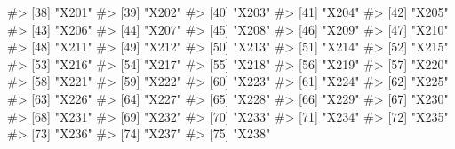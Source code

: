 \documentclass[
  letterpaper,
]{latex/krantz}
\makeatletter
\newenvironment{Shaded}{\begin{snugshade}}{\end{snugshade}}
\newcommand{\CommentTok}[1]{\textcolor[rgb]{0.37,0.37,0.37}{#1}}
\newenvironment{kframe}{%
\medskip{}
\setlength{\fboxsep}{.8em}
 \def\at@end@of@kframe{}%
 \ifinner\ifhmode%
  \def\at@end@of@kframe{\end{minipage}}%
  \begin{minipage}{\columnwidth}%
 \fi\fi%
 \def\FrameCommand##1{\hskip\@totalleftmargin \hskip-\fboxsep
 \colorbox{shadecolor}{##1}\hskip-\fboxsep
     \hskip-\linewidth \hskip-\@totalleftmargin \hskip\columnwidth}%
 \MakeFramed {\advance\hsize-\width
   \@totalleftmargin\z@ \linewidth\hsize
   \@setminipage}}%
 {\par\unskip\endMakeFramed%
 \at@end@of@kframe}
\renewenvironment{Shaded}{\begin{kframe}}{\end{kframe}}
\makeatother
\begin{document}
\begin{Shaded}
\begin{Highlighting}[]
\CommentTok{\#\textgreater{} [38] "X201"                            }
\CommentTok{\#\textgreater{} [39] "X202"                            }
\CommentTok{\#\textgreater{} [40] "X203"                            }
\CommentTok{\#\textgreater{} [41] "X204"                            }
\CommentTok{\#\textgreater{} [42] "X205"                            }
\CommentTok{\#\textgreater{} [43] "X206"                            }
\CommentTok{\#\textgreater{} [44] "X207"                            }
\CommentTok{\#\textgreater{} [45] "X208"                            }
\CommentTok{\#\textgreater{} [46] "X209"                            }
\CommentTok{\#\textgreater{} [47] "X210"                            }
\CommentTok{\#\textgreater{} [48] "X211"                            }
\CommentTok{\#\textgreater{} [49] "X212"                            }
\CommentTok{\#\textgreater{} [50] "X213"                            }
\CommentTok{\#\textgreater{} [51] "X214"                            }
\CommentTok{\#\textgreater{} [52] "X215"                            }
\CommentTok{\#\textgreater{} [53] "X216"                            }
\CommentTok{\#\textgreater{} [54] "X217"                            }
\CommentTok{\#\textgreater{} [55] "X218"                            }
\CommentTok{\#\textgreater{} [56] "X219"                            }
\CommentTok{\#\textgreater{} [57] "X220"                            }
\CommentTok{\#\textgreater{} [58] "X221"                            }
\CommentTok{\#\textgreater{} [59] "X222"                            }
\CommentTok{\#\textgreater{} [60] "X223"                            }
\CommentTok{\#\textgreater{} [61] "X224"                            }
\CommentTok{\#\textgreater{} [62] "X225"                            }
\CommentTok{\#\textgreater{} [63] "X226"                            }
\CommentTok{\#\textgreater{} [64] "X227"                            }
\CommentTok{\#\textgreater{} [65] "X228"                            }
\CommentTok{\#\textgreater{} [66] "X229"                            }
\CommentTok{\#\textgreater{} [67] "X230"                            }
\CommentTok{\#\textgreater{} [68] "X231"                            }
\CommentTok{\#\textgreater{} [69] "X232"                            }
\CommentTok{\#\textgreater{} [70] "X233"                            }
\CommentTok{\#\textgreater{} [71] "X234"                            }
\CommentTok{\#\textgreater{} [72] "X235"                            }
\CommentTok{\#\textgreater{} [73] "X236"                            }
\CommentTok{\#\textgreater{} [74] "X237"                            }
\CommentTok{\#\textgreater{} [75] "X238"                            }

\end{Highlighting}
\end{Shaded}
\end{document}
